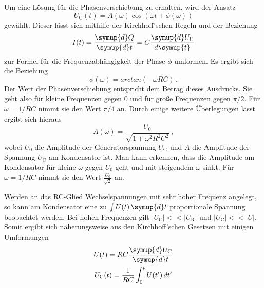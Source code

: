 Um eine Lösung für die Phasenverschiebung zu erhalten, wird der Ansatz
\begin{equation}
  U_{\text{C}}(t)=A(\omega)\cos(\omega t + \phi(\omega))
\end{equation}
gewählt. Dieser lässt sich mithilfe der Kirchhoff'schen Regeln und der Beziehung
\begin{equation}
  I(t)=\frac{\symup{d}Q}{\symup{d}t}=C\frac{\symup{d}U_{\text{C}}}{d\symup{t}}
\end{equation}
zur Formel für die Frequenzabhängigkeit der Phase $\phi$ umformen. Es ergibt sich die
Beziehung
\begin{equation}
  \phi(\omega)=arctan(-\omega R C) \,.
\end{equation}
Der Wert der Phasenverschiebung entspricht dem Betrag dieses Ausdrucks. Sie geht
also für kleine Frequenzen gegen $0$ und für große Frequenzen gegen $\pi/2$.
Für $\omega=1/RC$ nimmt sie den Wert $\pi/4$ an.
Durch einige weitere Überlegungen lässt ergibt sich hieraus
\begin{equation}
  A(\omega)=\frac{U_{\text{0}}}{\sqrt{1+\omega^2 R^2 C^2}} \,,
  \label{eqn:kondensatorfrequenz}
\end{equation}
wobei $U_{\text{0}}$ die Amplitude der Generatorspannung $U_{\text{G}}$ und $A$ die
Amplitude der Spannung $U_{\text{C}}$ am Kondensator ist.
Man kann erkennen, dass die Amplitude am Kondensator für kleine $\omega$ gegen $U_{\text{0}}$ geht
und mit steigendem $\omega$ sinkt. Für $\omega=1/RC$ nimmt sie den Wert
$\frac{U_{\text{0}}}{\sqrt{2}}$ an.

Werden an das RC-Glied Wechselspannungen mit sehr hoher Frequenz angelegt, so kann
am Kondensator eine zu $\int U(t)\,\symup{d}t$ proportionale Spannung beobachtet werden.
Bei hohen Frequenzen gilt $\lvert U_{\text{C}} \rvert << \lvert U_{\text{R}} \rvert$
und $\lvert U_{\text{C}} \rvert << \lvert U \rvert$. Somit ergibt sich näherungsweise
aus den Kirchhoff'schen Gesetzen mit einigen Umformungen
\begin{gather}
  U(t)= R C \frac{\symup{d}U_{\text{C}}}{\symup{d}t} \\
  U_{\text{C}}(t)=\frac{1}{RC}\int_0^t U(t')\, dt'
\end{gather}



\label{sec:Theorie}
